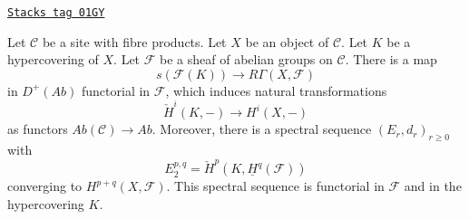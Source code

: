 \begin{lemma}
\label{hypercovering-lemma-cech-spectral-sequence}
\href{https://stacks.math.columbia.edu/tag/01GY}{\texttt{Stacks tag 01GY}}

Let $\mathcal{C}$ be a site with fibre products.
Let $X$ be an object of $\mathcal{C}$.
Let $K$ be a hypercovering of $X$.
Let $\mathcal{F}$ be a sheaf of abelian groups on $\mathcal{C}$.
There is a map
$$
s(\mathcal{F}(K))
\longrightarrow
R\Gamma(X, \mathcal{F})
$$
in $D^{+}(\textit{Ab})$ functorial in $\mathcal{F}$, which induces
natural transformations
$$
\check{H}^i(K, -) \longrightarrow H^i(X, -)
$$
as functors $\textit{Ab}(\mathcal{C}) \to \textit{Ab}$. Moreover,
there is a spectral sequence $(E_r, d_r)_{r \geq 0}$ with
$$
E_2^{p, q} = \check{H}^p(K, \underline{H}^q(\mathcal{F}))
$$
converging to $H^{p + q}(X, \mathcal{F})$.
This spectral sequence is functorial in $\mathcal{F}$ and
in the hypercovering $K$.
\end{lemma}

